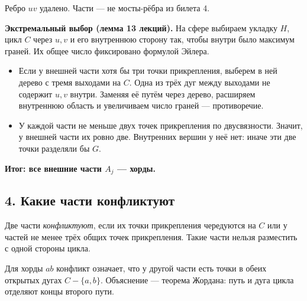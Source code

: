 \begin{center}

{\small Ребро \(uv\) удалено. Части — не мосты-рёбра из билета 4.}
\end{center}

\textbf{Экстремальный выбор (лемма 13 лекций).}
На сфере выбираем укладку \(H\), цикл \(C\) через \(u,v\) и его
внутреннюю сторону так, чтобы внутри было максимум граней.
Их общее число фиксировано формулой Эйлера.

\begin{itemize}[leftmargin=*,itemsep=3pt,topsep=3pt]
\item Если у внешней части хотя бы три точки прикрепления, выберем
в ней дерево с тремя выходами на \(C\). Одна из трёх дуг между выходами
не содержит \(u,v\) внутри. Заменяя её путём через дерево, расширяем
внутреннюю область и увеличиваем число граней — противоречие.
\item У каждой части не меньше двух точек прикрепления по двусвязности.
Значит, у внешней части их ровно две. Внутренних вершин у неё нет:
иначе эти две точки разделяли бы \(G\).
\end{itemize}
\textbf{Итог: все внешние части \(A_j\) — хорды.}

\subsection*{4. Какие части конфликтуют}
\hypertarget{pk:step4}{}
Две части \emph{конфликтуют}, если их точки прикрепления чередуются
на \(C\) или у частей не менее трёх общих точек прикрепления.
Такие части нельзя разместить с одной стороны цикла.

\begin{center}
\end{center}
Для хорды \(ab\) конфликт означает, что у другой части есть точки
в обеих открытых дугах \(C-\{a,b\}\). Объяснение — теорема Жордана:
путь и дуга цикла отделяют концы второго пути.

